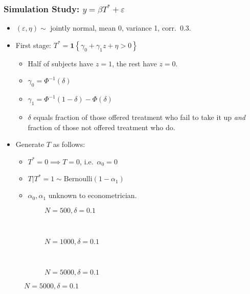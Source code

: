 \documentclass{beamer}
\begin{document}
\begin{frame}
  \frametitle{Simulation Study: $y = \beta T^* + \varepsilon$}
  \begin{itemize}
    \item $(\varepsilon, \eta) \sim $ jointly normal, mean 0, variance 1, corr.\ 0.3.
    \item First stage: $T^* = \mathbf{1}\left\{ \gamma_0 + \gamma_1 z + \eta > 0 \right\}$
      \begin{itemize}
        \item Half of subjects have $z=1$, the rest have $z=0$.
        \item $\gamma_0 = \Phi^{-1}(\delta)$
        \item $\gamma_1 = \Phi^{-1}(1-\delta) - \Phi(\delta)$   
        \item $\delta$ equals fraction of those offered treatment who fail to take it up \emph{and} fraction of those not offered treatment who do.
      \end{itemize}
    \item Generate $T$ as follows:
      \begin{itemize}
        \item $T^* = 0 \implies T=0$, i.e.\ $\alpha_0 = 0$
        \item $T|T^*=1 \sim \mbox{Bernoulli}(1-\alpha_1)$
        \item $\alpha_0, \alpha_1$ unknown to econometrician.
      \end{itemize}
  \end{itemize}

  
\end{frame}
\begin{frame}
  \begin{center}
    {}
  \end{center}
\end{frame}
\begin{frame}
\begin{figure}[h]
  \scriptsize
  \begingroup
  \centering
  \begin{subfigure}[b]{0.31\textwidth}
\caption{\footnotesize $N=500, \delta = 0.1$}
  
  \end{subfigure}
  ~
  \begin{subfigure}[b]{0.31\textwidth}
    \caption{\footnotesize $N=1000, \delta = 0.1$} 
  
  \end{subfigure}
  ~
  \begin{subfigure}[b]{0.31\textwidth}
\caption{\footnotesize $N=5000, \delta = 0.1$}
  
  \end{subfigure}
\endgroup
\end{figure}
\end{frame}
\end{document}
